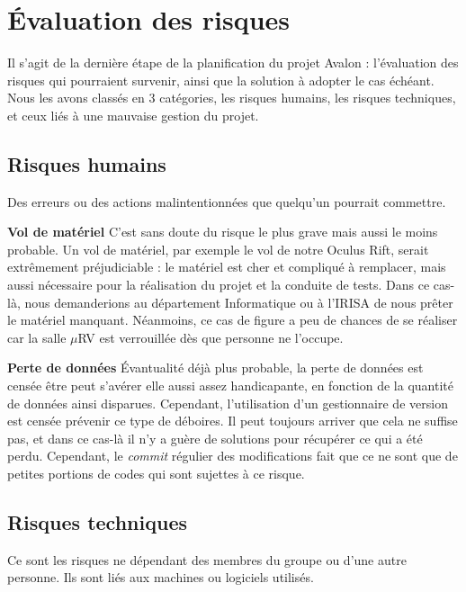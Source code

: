 \section{Évaluation des risques}

Il s'agit de la dernière étape de la planification du projet Avalon : l’évaluation des risques qui pourraient survenir, ainsi que la solution à adopter le cas échéant. Nous les avons classés en 3 catégories, les risques humains, les risques techniques, et ceux liés à une mauvaise gestion du projet. 

\subsection{Risques humains}
Des erreurs ou des actions malintentionnées que quelqu'un pourrait commettre. \newline

\textbf{Vol de matériel}
\newline
C'est sans doute du risque le plus grave mais aussi le moins probable. Un vol de matériel, par exemple le vol de notre Oculus Rift, serait extrêmement préjudiciable : le matériel est cher et compliqué à remplacer, mais aussi nécessaire pour la réalisation du projet et la conduite de tests. Dans ce cas-là, nous demanderions au département Informatique ou à l'IRISA de nous prêter le matériel manquant.\newline
Néanmoins, ce cas de figure a peu de chances de se réaliser car la salle $\mu$RV est verrouillée dès que personne ne l'occupe.\newline

\textbf{Perte de données}
\newline
Évantualité déjà plus probable, la perte de données est censée être peut s'avérer elle aussi assez handicapante, en fonction de la quantité de données ainsi disparues. Cependant, l'utilisation d'un gestionnaire de version est censée prévenir ce type de déboires.\newline
Il peut toujours arriver que cela ne suffise pas, et dans ce cas-là il n'y a guère de solutions pour récupérer ce qui a été perdu. Cependant, le \emph{commit} régulier des modifications fait que ce ne sont que de petites portions de codes qui sont sujettes à ce risque.\newline

\subsection{Risques techniques}
Ce sont les risques ne dépendant des membres du groupe ou d'une autre personne. Ils sont liés aux machines ou logiciels utilisés.\newline

